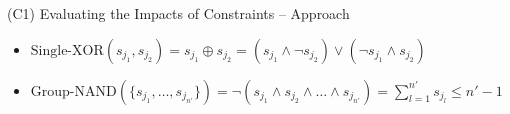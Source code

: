 \documentclass[en, navbarinline, handout]{sdqbeamer}
\begin{document}
\begin{frame}[t]{(C1) Evaluating the Impacts of Constraints -- Approach}
\begin{itemize}
\begin{itemize}
		\end{itemize}
	\end{itemize}
	\pause
	\vspace{0.5\baselineskip}
	\begin{examples}
		\setlength{\leftmargini}{0.4cm} %
		\begin{itemize}
			\item $\text{Single-XOR}(s_{j_1}, s_{j_2}) = s_{j_1} \oplus s_{j_2} = (s_{j_1} \land \lnot s_{j_2}) \lor (\lnot s_{j_1} \land s_{j_2})$
			\item $\text{Group-NAND}(\{s_{j_1}, \dots, s_{j_{n'}}\}) =	\lnot (s_{j_1} \land s_{j_2} \land \dots \land s_{j_{n'}}) = \sum_{l=1}^{n'} s_{j_l} \leq n'-1$
		\end{itemize}
	\end{examples}
\end{frame}
\end{document}
